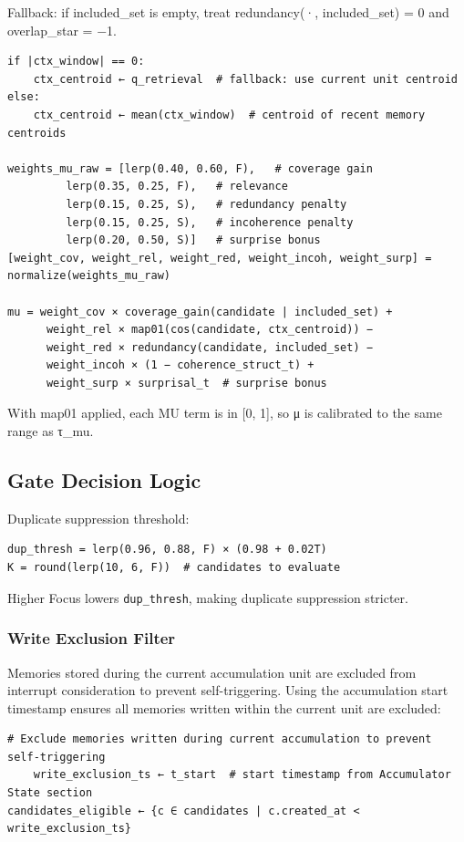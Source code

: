 \documentclass[
  letterpaper,
  DIV=11,
  numbers=noendperiod]{scrartcl}
\begin{document}
Fallback: if included\_set is empty, treat redundancy(·, included\_set)
= 0 and overlap\_star = −1.

\begin{verbatim}
if |ctx_window| == 0:
    ctx_centroid ← q_retrieval  # fallback: use current unit centroid
else:
    ctx_centroid ← mean(ctx_window)  # centroid of recent memory centroids

weights_mu_raw = [lerp(0.40, 0.60, F),   # coverage gain
         lerp(0.35, 0.25, F),   # relevance
         lerp(0.15, 0.25, S),   # redundancy penalty
         lerp(0.15, 0.25, S),   # incoherence penalty
         lerp(0.20, 0.50, S)]   # surprise bonus
[weight_cov, weight_rel, weight_red, weight_incoh, weight_surp] = normalize(weights_mu_raw)

mu = weight_cov × coverage_gain(candidate | included_set) +
      weight_rel × map01(cos(candidate, ctx_centroid)) −
      weight_red × redundancy(candidate, included_set) −
      weight_incoh × (1 − coherence_struct_t) +
      weight_surp × surprisal_t  # surprise bonus
\end{verbatim}

With map01 applied, each MU term is in {[}0, 1{]}, so μ is calibrated to
the same range as τ\_mu.

\subsection{Gate Decision Logic}\label{gate-decision-logic}

Duplicate suppression threshold:

\begin{verbatim}
dup_thresh = lerp(0.96, 0.88, F) × (0.98 + 0.02T)
K = round(lerp(10, 6, F))  # candidates to evaluate
\end{verbatim}

Higher Focus lowers \texttt{dup\_thresh}, making duplicate suppression
stricter.

\subsubsection{Write Exclusion Filter}\label{write-exclusion-filter}

Memories stored during the current accumulation unit are excluded from
interrupt consideration to prevent self-triggering. Using the
accumulation start timestamp ensures all memories written within the
current unit are excluded:

\begin{verbatim}
# Exclude memories written during current accumulation to prevent self-triggering
    write_exclusion_ts ← t_start  # start timestamp from Accumulator State section
candidates_eligible ← {c ∈ candidates | c.created_at < write_exclusion_ts}
\end{verbatim}
\end{document}
